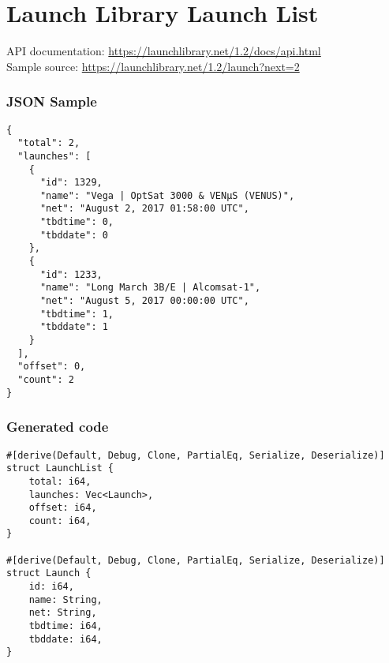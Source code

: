 \section{Launch Library Launch List}
\label{app:worldbank}

API documentation: \url{https://launchlibrary.net/1.2/docs/api.html} \\
Sample source: \url{https://launchlibrary.net/1.2/launch?next=2}

\begin{multicols}{2}

\subsubsection{JSON Sample}

\begin{verbatim}
{
  "total": 2,
  "launches": [
    {
      "id": 1329,
      "name": "Vega | OptSat 3000 & VENµS (VENUS)",
      "net": "August 2, 2017 01:58:00 UTC",
      "tbdtime": 0,
      "tbddate": 0
    },
    {
      "id": 1233,
      "name": "Long March 3B/E | Alcomsat-1",
      "net": "August 5, 2017 00:00:00 UTC",
      "tbdtime": 1,
      "tbddate": 1
    }
  ],
  "offset": 0,
  "count": 2
}
\end{verbatim}

\subsubsection{Generated code}

\begin{verbatim}
#[derive(Default, Debug, Clone, PartialEq, Serialize, Deserialize)]
struct LaunchList {
    total: i64,
    launches: Vec<Launch>,
    offset: i64,
    count: i64,
}

#[derive(Default, Debug, Clone, PartialEq, Serialize, Deserialize)]
struct Launch {
    id: i64,
    name: String,
    net: String,
    tbdtime: i64,
    tbddate: i64,
}
\end{verbatim}
\end{multicols}

